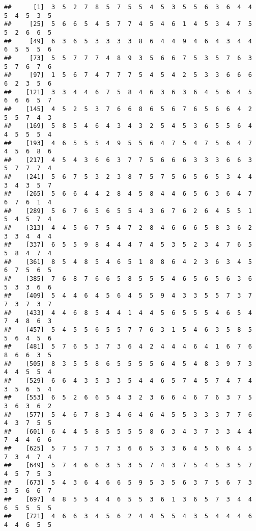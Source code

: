 \documentclass[
]{book}
\begin{document}
\begin{verbatim}
##      [1]  3  5  2  7  8  5  7  5  5  4  5  3  5  5  6  3  6  4  4  5  4  5  3  5
##     [25]  5  6  6  5  4  5  7  7  4  5  4  6  1  4  5  3  4  7  5  5  2  6  6  5
##     [49]  6  3  6  5  3  3  3  3  8  6  4  4  9  4  6  4  3  4  4  6  5  5  5  6
##     [73]  5  5  7  7  7  4  8  9  3  5  6  6  7  5  3  5  7  6  3  5  7  6  7  6
##     [97]  1  5  6  7  4  7  7  7  5  4  5  4  2  5  3  3  6  6  6  6  2  3  5  6
##    [121]  3  3  4  4  6  7  5  8  4  6  3  6  3  6  4  5  6  4  5  6  6  6  5  7
##    [145]  4  5  2  5  3  7  6  6  8  6  5  6  7  6  5  6  6  4  2  5  5  7  4  3
##    [169]  5  8  5  4  6  4  3  4  3  2  5  4  5  3  6  5  5  6  4  4  5  5  5  4
##    [193]  4  6  5  5  5  4  9  5  5  6  4  7  5  4  7  5  6  4  7  4  5  6  8  6
##    [217]  4  5  4  3  6  6  3  7  7  5  6  6  6  3  3  3  6  6  3  5  7  7  7  4
##    [241]  5  6  7  5  3  2  3  8  7  5  7  5  6  5  6  5  3  4  4  3  4  3  5  7
##    [265]  5  6  6  4  4  2  8  4  5  8  4  4  6  5  6  3  6  4  7  6  7  6  1  4
##    [289]  5  6  7  6  5  6  5  5  4  3  6  7  6  2  6  4  5  5  1  5  4  5  7  4
##    [313]  4  4  5  6  7  5  4  7  2  8  4  6  6  6  5  8  3  6  2  3  3  4  4  4
##    [337]  6  5  5  9  8  4  4  4  7  4  5  3  5  2  3  4  7  6  5  5  8  4  7  4
##    [361]  8  5  4  8  5  4  6  5  1  8  8  6  4  2  3  6  3  4  5  6  7  5  6  5
##    [385]  7  6  8  7  6  6  5  8  5  5  5  4  6  5  6  5  6  3  6  5  3  3  6  6
##    [409]  5  4  4  6  4  5  6  4  5  5  9  4  3  3  5  5  7  3  7  7  3  7  3  7
##    [433]  4  4  6  8  5  4  4  1  4  4  5  6  5  5  5  4  6  5  4  7  4  8  6  3
##    [457]  5  4  5  5  6  5  5  7  7  6  3  1  5  4  6  3  5  8  5  5  6  4  5  6
##    [481]  5  7  6  5  3  7  3  6  4  2  4  4  4  6  4  1  6  7  6  8  6  6  3  5
##    [505]  8  3  5  5  8  6  5  5  5  5  6  4  5  4  8  3  9  7  3  4  4  5  5  4
##    [529]  6  6  4  3  5  3  3  5  4  4  6  5  7  4  5  7  4  7  4  3  5  6  5  4
##    [553]  6  5  2  6  6  5  4  3  2  3  6  6  4  6  7  6  3  7  5  3  6  3  6  2
##    [577]  5  4  6  7  8  3  4  6  4  6  4  5  5  3  3  3  7  7  6  4  3  7  5  5
##    [601]  6  4  4  5  8  5  5  5  5  8  6  3  4  3  7  3  3  4  4  7  4  4  6  6
##    [625]  5  7  5  7  5  7  3  6  6  5  3  3  6  4  5  6  6  4  5  7  3  4  7  4
##    [649]  5  7  4  6  6  3  5  3  5  7  4  3  7  5  4  5  3  5  7  4  5  7  5  3
##    [673]  5  4  3  6  4  6  6  5  9  5  3  5  6  3  7  5  6  7  3  3  5  6  6  7
##    [697]  4  8  5  5  4  4  6  5  5  3  6  1  3  6  5  7  3  4  4  6  5  5  5  5
##    [721]  4  6  6  3  4  5  6  2  4  4  5  5  4  3  5  4  4  4  6  4  4  6  5  5

\end{verbatim}
\end{document}
